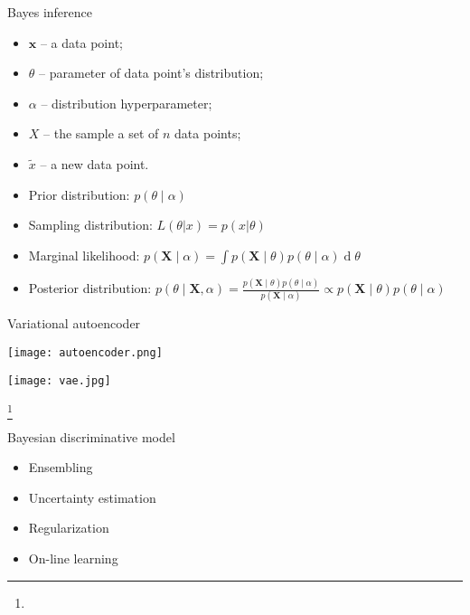 \documentclass[14pt,mathserif,aspectratio=43,unicode]{beamer}
\newcommand\articlenote[1]{%
  \begingroup%
  \renewcommand\thefootnote{}\footnote{#1}%
  \addtocounter{footnote}{-1}%
  \endgroup%
}
\newcommand{\x}{\mathbf{x}}
\begin{document}

\begin{frame}{Bayes inference}

    \begin{itemize}
        \item $\x$ -- a data point;
        \item $\theta$ -- parameter of data point's distribution; 
        \item $\alpha$ -- distribution hyperparameter;
        \item $X$ -- the sample a set of $n$ data points;
        \item $\tilde{x}$ -- a new data point.
        \item Prior distribution: $p(\theta \mid \alpha)$
        \item Sampling distribution: $L(\theta|x) = p(x|\theta)$
        \item Marginal likelihood: $p(\mathbf{X} \mid \alpha) = \int p(\mathbf{X} \mid \theta) p(\theta \mid \alpha) \operatorname{d}\!\theta$
        \item Posterior distribution: $p(\theta \mid \mathbf{X},\alpha) = \frac{p(\mathbf{X} \mid \theta) p(\theta \mid \alpha)}{p(\mathbf{X} \mid \alpha)} \propto p(\mathbf{X} \mid \theta) p(\theta \mid \alpha)$
    \end{itemize}
    
\end{frame}


\begin{frame}{Variational autoencoder}

    \begin{center}
        \texttt{[image: autoencoder.png]}
        
        \texttt{[image: vae.jpg]}
    \end{center}
    
    \articlenote{}

\end{frame}


\begin{frame}{Bayesian discriminative model}

    \begin{itemize}
        \item Ensembling
        \item Uncertainty estimation
        \item Regularization
        \item On-line learning
    \end{itemize}
    
\end{frame}
\end{document}
